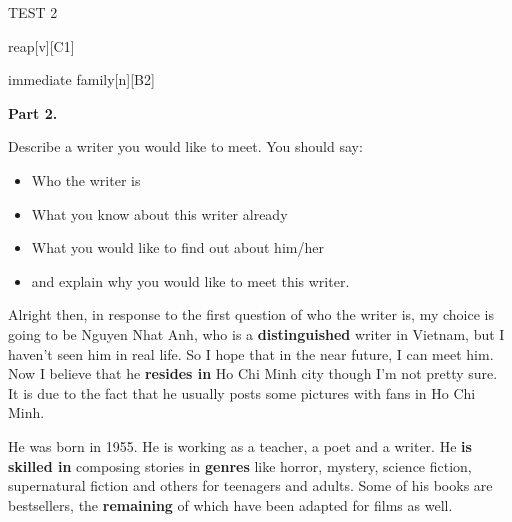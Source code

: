 \begin{glossarymc}[Cambridge 11]
\begin{test}{TEST 2}
\begin{VocabExplain}[Part 1]
            \begin{ExplainCard}{reap}[v][C1]
            \end{ExplainCard}

            \begin{ExplainCard}{immediate family}[n][B2]
            \end{ExplainCard}
        \end{VocabExplain}

    \noindent
    \textbf{Part 2.}
    \begin{qa}{Describe a writer you would like to meet. You should say:}
    \begin{itemize}
        \item Who the writer is
        \item What you know about this writer already
        \item What you would like to find out about him/her
        \item and explain why you would like to meet this writer.
    \end{itemize}

    Alright then, in response to the first question of who the writer is, my choice is going to be Nguyen Nhat Anh, who is a \textbf{distinguished} writer in Vietnam, but I haven’t seen him in real life. So I hope that in the near future, I can meet him. Now I believe that he \textbf{resides in} Ho Chi Minh city though I’m not pretty sure. It is due to the fact that he usually posts some pictures with fans in Ho Chi Minh.  

    He was born in 1955. He is working as a teacher, a poet and a writer. He \textbf{is skilled in} composing stories in \textbf{genres} like horror, mystery, science fiction, supernatural fiction and others for teenagers and adults. Some of his books are bestsellers, the \textbf{remaining} of which have been adapted for films as well.  


\end{qa}
\end{test}
\end{glossarymc}

